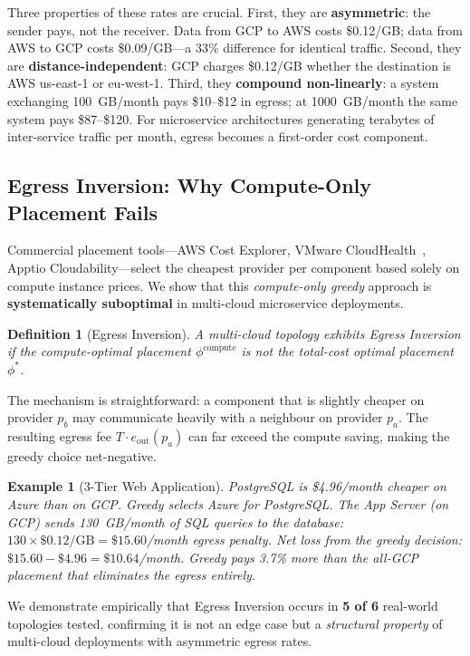 \documentclass[sigconf,10pt]{acmart}
\newtheorem{definition}{Definition}
\newtheorem{example}{Example}
\begin{document}
Three properties of these rates are crucial.
First, they are \textbf{asymmetric}: the sender pays, not the receiver.
Data from GCP to AWS costs \$0.12/GB; data from AWS to GCP costs \$0.09/GB---a
33\% difference for identical traffic.
Second, they are \textbf{distance-independent}: GCP charges \$0.12/GB whether the
destination is AWS us-east-1 or eu-west-1.
Third, they \textbf{compound non-linearly}: a system exchanging 100~GB/month pays
\$10--\$12 in egress; at 1000~GB/month the same system pays \$87--\$120.
For microservice architectures generating terabytes of inter-service traffic per month,
egress becomes a first-order cost component.

\subsection{Egress Inversion: Why Compute-Only Placement Fails}

Commercial placement tools---AWS Cost Explorer, VMware CloudHealth~\cite{cloudhealth},
Apptio Cloudability---select the cheapest provider per component based solely on
compute instance prices.
We show that this \emph{compute-only greedy} approach is \textbf{systematically
suboptimal} in multi-cloud microservice deployments.

\begin{definition}[Egress Inversion]\label{def:inv_intro}
A multi-cloud topology exhibits \emph{Egress Inversion} if the compute-optimal
placement $\phi^{\text{compute}}$ is not the total-cost optimal placement $\phi^*$.
\end{definition}

The mechanism is straightforward: a component that is slightly cheaper on provider
$p_b$ may communicate heavily with a neighbour on provider $p_a$.
The resulting egress fee $T \cdot e_{\text{out}}(p_a)$ can far exceed the compute
saving, making the greedy choice net-negative.

\begin{example}[3-Tier Web Application]\label{ex:3tier}
PostgreSQL is \$4.96/month cheaper on Azure than on GCP.
Greedy selects Azure for PostgreSQL.
The App Server (on GCP) sends 130~GB/month of SQL queries to the database:
$130 \times \$0.12/\text{GB} = \$15.60$/month egress penalty.
Net loss from the greedy decision: $\$15.60 - \$4.96 = \$10.64$/month.
Greedy pays 3.7\% more than the all-GCP placement that eliminates the egress entirely.
\end{example}

We demonstrate empirically that Egress Inversion occurs in \textbf{5 of 6} real-world
topologies tested, confirming it is not an edge case but a \emph{structural property}
of multi-cloud deployments with asymmetric egress rates.
\end{document}
